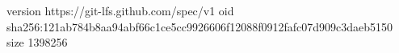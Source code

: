 version https://git-lfs.github.com/spec/v1
oid sha256:121ab784b8aa94abf66c1ce5cc9926606f12088f0912fafc07d909c3daeb5150
size 1398256
